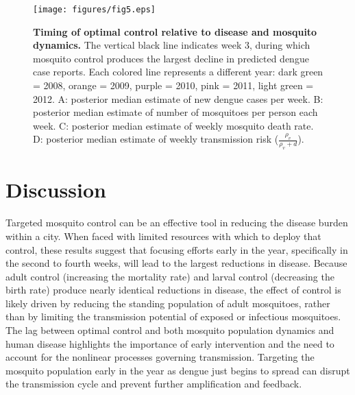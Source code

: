 \documentclass[10pt,letterpaper]{article}
\begin{document}
\begin{figure}[!h]
\texttt{[image: figures/fig5.eps]}
\caption{{\bf Timing of optimal control relative to disease and mosquito dynamics.}
The vertical black line indicates week 3, during which mosquito control produces the largest decline in predicted dengue case reports. Each colored line represents a different year: dark green = 2008, orange = 2009, purple = 2010, pink = 2011, light green = 2012. A: posterior median estimate of new dengue cases per week. B: posterior median estimate of number of mosquitoes per person each week. C: posterior median estimate of weekly mosquito death rate. D: posterior median estimate of weekly transmission risk ($\frac{\rho_v}{\rho_v + d}$).
}
\label{timing}
\end{figure}

\section*{Discussion}

Targeted mosquito control can be an effective tool in reducing the disease burden within a city.
When faced with limited resources with which to deploy that control, these results suggest that focusing efforts early in the year, specifically in the second to fourth weeks, will lead to the largest reductions in disease.
Because adult control (increasing the mortality rate) and larval control (decreasing the birth rate) produce nearly identical reductions in disease, the effect of control is likely driven by reducing the standing population of adult mosquitoes, rather than by limiting the transmission potential of exposed or infectious mosquitoes.
The lag between optimal control and both mosquito population dynamics and human disease highlights the importance of early intervention and the need to account for the nonlinear processes governing transmission.
Targeting the mosquito population early in the year as dengue just begins to spread can disrupt the transmission cycle and prevent further amplification and feedback.
\end{document}
